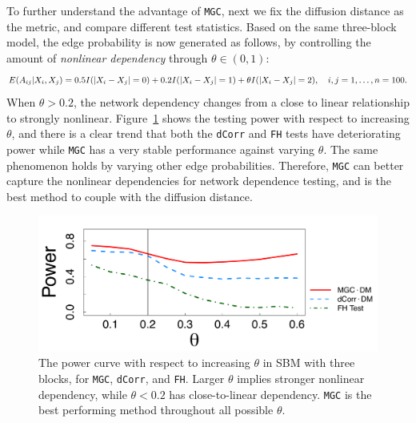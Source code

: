 \documentclass[11pt]{article}
\theoremstyle{definition}
\begin{document}
To further understand the advantage of \texttt{MGC}, next we fix the diffusion distance as the metric, and compare different test statistics. Based on the same three-block model, the edge probability is now generated as follows, by controlling the amount of \textit{nonlinear dependency} through $\theta \in (0, 1)$:
\begin{equation}
E(A_{ij} | X_{i}, X_{j}) = 0.5 I(|X_{i} - X_{j}| = 0) + 0.2 I(|X_{i} - X_{j}| = 1) + \theta I(|X_{i} - X_{j}| = 2), \quad i,j = 1, \ldots, n = 100.
\label{eq:mono}
\vspace*{-0.4cm}
\end{equation}
When $\theta > 0.2$, the network dependency changes from a close to linear relationship to strongly nonlinear. Figure~\ref{fig:powerplot} shows the testing power with respect to increasing $\theta$, and there is a clear trend that both the \texttt{dCorr} and \texttt{FH} tests have deteriorating power while \texttt{MGC} has a very stable performance against varying $\theta$. The same phenomenon holds by varying other edge probabilities. Therefore, \texttt{MGC} can better capture the nonlinear dependencies for network dependence testing, and is the best method to couple with the diffusion distance.
\begin{figure}[ht]
	\centering
	\includegraphics[width=0.7\linewidth]{mono_short.pdf}
	\caption{The power curve with respect to increasing $\theta$ in SBM with three blocks, for \texttt{MGC}, \texttt{dCorr}, and \texttt{FH}. Larger $\theta$ implies stronger nonlinear dependency, while $\theta<0.2$ has close-to-linear dependency. \texttt{MGC} is the best performing method throughout all possible $\theta$.} 
	\label{fig:powerplot}
\end{figure}
\end{document}
